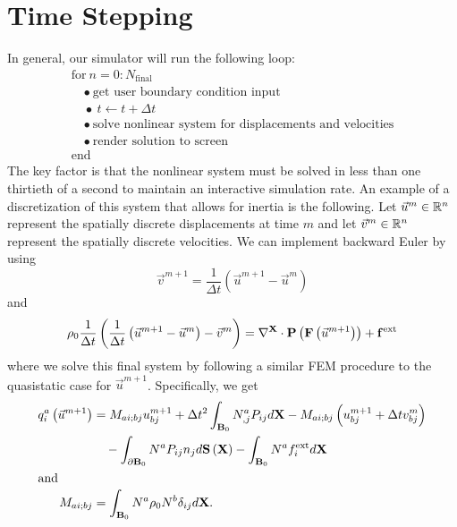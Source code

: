 \section{Time Stepping}

In general, our simulator will run the following loop:
\begin{equation*}
\begin{array}{lc}
\text{for} \ n = 0 : N_\text{final} \\
\quad \bullet \ \text{get user boundary condition input} \\
\quad \bullet \ t \leftarrow t + \Delta{t} \\
\quad \bullet \ \text{solve nonlinear system for displacements and velocities} \\
\quad \bullet \ \text{render solution to screen}\\
\text{end}
\end{array}
\end{equation*}
The key factor is that the nonlinear system must be solved in less than one thirtieth of a second to maintain an interactive simulation rate. An example of a discretization of this system that allows for inertia is the following. Let $\vec{u}^m \in \mathbb{R}^n$ represent the spatially discrete displacements at time $m$ and let $\vec{v}^m \in \mathbb{R}^n$ represent the spatially discrete velocities. We can implement backward Euler by using
\begin{equation*}
\vec{v}^{m+1} = \frac{1}{\Delta t} \left( \vec{u}^{m+1} - \vec{u}^m \right)
\end{equation*}
and
\begin{equation*}
\rho_0 \frac{1}{\Delta t} \left( \frac{1}{\Delta t} \left( \vec{u}^{m+1} - \vec{u}^m \right) - \vec{v}^m \right) = \nabla^{\mathbf{X}} \cdot \mathbf{P} \left( \mathbf{F} \left( \vec{u}^{m+1} \right) \right) + \mathbf{f}^{\text{ext}}
\end{equation*}
where we solve this final system by following a similar FEM procedure to the quasistatic case for $\vec{u}^{m+1}$. Specifically, we get
\begin{align*}
q^a_i \left( \vec{u}^{m+1} \right)
& = M_{ai;bj} u^{m+1}_{bj} + \Delta t^2 \int_{\mathbf{B}_0} N^a_{,j} P_{ij} d\mathbf{X} - M_{ai;bj} \left( u^{m+1}_{bj} + \Delta{t} v^m_{bj} \right) \\
& \quad {} - \int_{\partial\mathbf{B}_0} N^a P_{ij} n_j d\mathbf{S} \left( \mathbf{X} \right) - \int_{\mathbf{B}_0} N^a f^{\text{ext}}_i d\mathbf{X} \\
\intertext{and}
M_{ai;bj} &= \int_{\mathbf{B}_0} N^a \rho_0 N^b \delta_{ij} d\mathbf{X}.
\end{align*}
